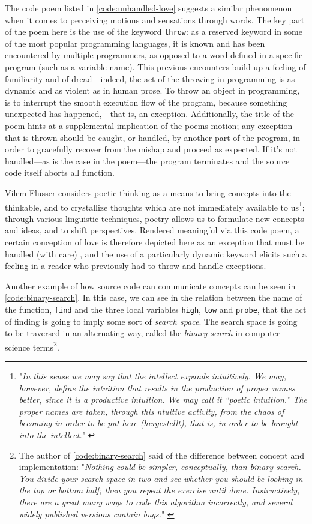 The code poem listed in \ref{code:unhandled-love} suggests a similar phenomenon when it comes to perceiving motions and sensations through words. The key part of the poem here is the use of the keyword \lstinline{throw}: as a reserved keyword in some of the most popular programming languages, it is known and has been encountered by multiple programmers, as opposed to a word defined in a specific program (such as a variable name). This previous encounters build up a feeling of familiarity and of dread—indeed, the act of the throwing in programming is as dynamic and as violent as in human prose. To throw an object in programming, is to interrupt the smooth execution flow of the program, because something unexpected has happened,—that is, an exception. Additionally, the title of the poem hints at a supplemental implication of the poems motion; any exception that is thrown should be caught, or handled, by another part of the program, in order to gracefully recover from the mishap and proceed as expected. If it's not handled—as is the case in the poem—the program terminates and the source code itself aborts all function.

Vilem Flusser considers poetic thinking as a means to bring concepts into the thinkable, and to crystallize thoughts which are not immediately available to us\footnote{"\emph{In this sense we may say that the intellect expands intuitively. We may, however, define the intuition that results in the production of proper names better, since it is a productive intuition. We may call it “poetic intuition.” The proper names are taken, through this ntuitive activity, from the chaos of becoming in order to be put here (hergestellt), that is, in order to be brought into the intellect.}" \citep{flusser_doubt_2014}}; through various linguistic techniques, poetry allows us to formulate new concepts and ideas, and to shift perspectives. Rendered meaningful via this code poem, a certain conception of love is therefore depicted here as an exception that must be handled (with care) , and the use of a particularly dynamic keyword elicits such a feeling in a reader who previously had to throw and handle exceptions.

Another example of how source code can communicate concepts can be seen in \ref{code:binary-search}. In this case, we can see in the relation between the name of the function, \lstinline{find} and the three local variables \lstinline{high}, \lstinline{low} and \lstinline{probe}, that the act of finding is going to imply some sort of \emph{search space}. The search space is going to be traversed in an alternating way, called the \emph{binary search} in computer science terms\footnote{The author of \ref{code:binary-search} said of the difference between concept and implementation: "\emph{Nothing could be simpler, conceptually, than binary search. You divide your search space in two and see whether you should be looking in the top or bottom half; then you repeat the exercise until done. Instructively, there are a great many ways to code this algorithm incorrectly, and several widely published versions contain bugs.}" \citep{bray_finding_2007}}.


